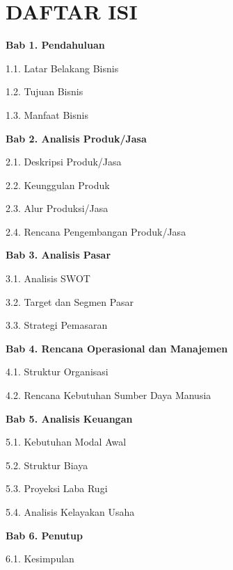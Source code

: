 \section*{\centering\fontsize{14}{21}\selectfont\bfseries DAFTAR ISI}

\newcommand{\toci}[2]{#1 \dotfill\ \pageref{#2}\par}

\textbf{Bab 1. Pendahuluan}\par
\toci{1.1. Latar Belakang Bisnis}{sec:1-1}
\toci{1.2. Tujuan Bisnis}{sec:1-2}
\toci{1.3. Manfaat Bisnis}{sec:1-3}

\vspace{0.3cm}
\textbf{Bab 2. Analisis Produk/Jasa}\par
\toci{2.1. Deskripsi Produk/Jasa}{sec:2-1}
\toci{2.2. Keunggulan Produk}{sec:2-2}
\toci{2.3. Alur Produksi/Jasa}{sec:2-3}
\toci{2.4. Rencana Pengembangan Produk/Jasa}{sec:2-4}

\vspace{0.3cm}
\textbf{Bab 3. Analisis Pasar}\par
\toci{3.1. Analisis SWOT}{sec:3-1}
\toci{3.2. Target dan Segmen Pasar}{sec:3-2}
\toci{3.3. Strategi Pemasaran}{sec:3-3}

\vspace{0.3cm}
\textbf{Bab 4. Rencana Operasional dan Manajemen}\par
\toci{4.1. Struktur Organisasi}{sec:4-1}
\toci{4.2. Rencana Kebutuhan Sumber Daya Manusia}{sec:4-2}

\vspace{0.3cm}
\textbf{Bab 5. Analisis Keuangan}\par
\toci{5.1. Kebutuhan Modal Awal}{sec:5-1}
\toci{5.2. Struktur Biaya}{sec:5-2}
\toci{5.3. Proyeksi Laba Rugi}{sec:5-3}
\toci{5.4. Analisis Kelayakan Usaha}{sec:5-4}

\vspace{0.3cm}
\textbf{Bab 6. Penutup}\par
\toci{6.1. Kesimpulan}{sec:6-1}

